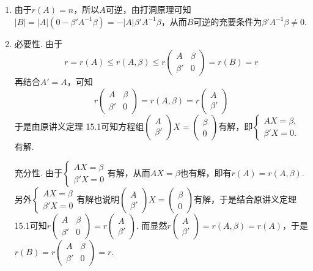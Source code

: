 \documentclass[UTF8,12pt,a4paper,fontset=fandol]{ctexart}
\begin{document}
\begin{solve}
\begin{enumerate}
                \item 由于$r(A)=n$，所以$A$可逆，由打洞原理可知$|B|=|A|(0-\beta' A^{-1}\beta)=-|A|\beta' A^{-1}\beta$，从而$B$可逆的充要条件为$\beta' A^{-1}\beta\neq 0$.

                \item 必要性. 由于
                      \[ r=r(A)\leqslant r(A,\beta)\leqslant r\begin{pmatrix} A & \beta \\ \beta' & 0 \end{pmatrix}=r(B)=r \]
                      再结合$A'=A$，可知
                      \[ r\begin{pmatrix} A & \beta \\ \beta' & 0 \end{pmatrix} =r(A,\beta)=r\begin{pmatrix} A \\ \beta' \end{pmatrix} \]
                      于是由原讲义定理 15.1可知方程组$\begin{pmatrix} A \\ \beta' \end{pmatrix}X=\begin{pmatrix} \beta \\ 0 \end{pmatrix}$有解，即$\begin{cases} AX=\beta, \\ \beta' X=0. \end{cases}$有解.

                      充分性. 由于$\begin{cases} AX=\beta \\ \beta' X=0 \end{cases}$有解，从而$AX=\beta$也有解，即有$r(A)=r(A,\beta)$. 另外$\begin{cases} AX=\beta \\ \beta' X=0 \end{cases}$有解也说明$\begin{pmatrix} A \\ \beta' \end{pmatrix}X=\begin{pmatrix} \beta \\ 0 \end{pmatrix}$有解，于是结合原讲义定理 15.1可知$r\begin{pmatrix} A & \beta \\ \beta' & 0 \end{pmatrix}=r\begin{pmatrix} A \\ \beta' \end{pmatrix}$. 而显然$r\begin{pmatrix} A \\ \beta' \end{pmatrix}=r(A,\beta)=r(A)$，于是$r(B)=r\begin{pmatrix} A & \beta \\ \beta' & 0 \end{pmatrix}=r$.


\end{enumerate}
\end{solve}
\end{document}
